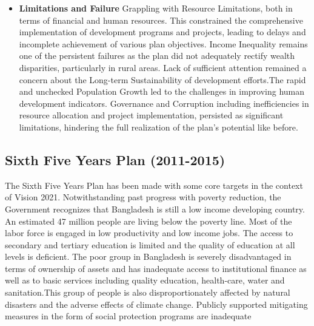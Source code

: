 \begin{itemize}
	\item\textbf{Limitations and Failure}
	Grappling with Resource Limitations, both in terms of financial and human resources. This constrained the 
	comprehensive implementation of development programs and projects, leading to delays and incomplete 
	achievement of various plan objectives. Income Inequality remains one of the persistent failures as 
	the plan did not adequately rectify wealth disparities, particularly in rural areas. Lack of sufficient 
	attention remained a concern about the Long-term Sustainability of development efforts.The rapid and 
	unchecked Population Growth led to the challenges in improving human development indicators. 
	Governance and Corruption including inefficiencies in resource allocation and project implementation, 
	persisted as significant limitations, hindering the full realization of the plan's potential like before.
\end{itemize}

\newpage
\subsection{Sixth Five Years Plan (2011-2015)}
The Sixth Five Years Plan has been made with some core targets in the context of Vision
2021. Notwithstanding past progress with poverty reduction, the Government recognizes
that Bangladesh is still a low income developing country. An estimated 47 million people are
living below the poverty line. Most of the labor force is engaged in low productivity and
low income jobs. The access to secondary and tertiary education is limited and the quality of
education at all levels is deficient. The poor group in Bangladesh is severely disadvantaged
in terms of ownership of assets and has inadequate access to institutional finance as well
as to basic services including quality education, health-care, water and sanitation.This group
of people is also disproportionately affected by natural disasters and the adverse effects of
climate change. Publicly supported mitigating measures in the form of social protection
programs are inadequate

